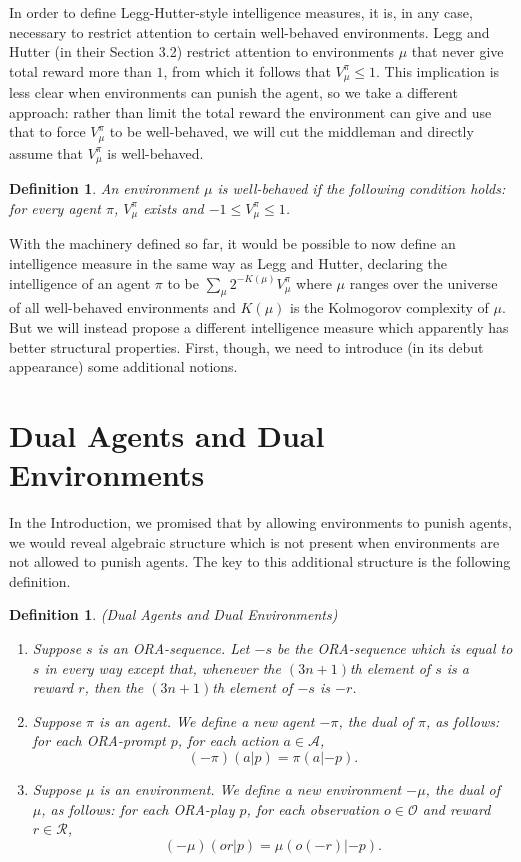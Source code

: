 \documentclass{article}
\newtheorem{definition}[theorem]{Definition}
\begin{document}
In order to define Legg-Hutter-style
intelligence measures, it is, in any case, necessary to restrict attention to
certain well-behaved environments. Legg and Hutter (in their Section 3.2)
restrict attention to environments $\mu$ that never give total reward more than $1$,
from which it follows that $V^\pi_\mu\leq 1$. This implication is less clear
when environments can punish the agent, so we take a different approach:
rather than limit the total reward the environment can give and use that to
force $V^\pi_\mu$ to be well-behaved, we will cut the middleman and
directly assume that $V^\pi_\mu$ is well-behaved.

\begin{definition}
    An environment $\mu$ is \emph{well-behaved} if the following
    condition holds: for every agent $\pi$, $V^\pi_\mu$ exists and
    $-1\leq V^\pi_\mu\leq 1$.
\end{definition}

With the machinery defined so far, it would be possible to now define an
intelligence measure in the same way as Legg and Hutter,
declaring the intelligence of an agent $\pi$ to be
$\sum_{\mu} 2^{-K(\mu)}V^\pi_\mu$ where $\mu$ ranges over the universe
of all well-behaved environments and $K(\mu)$ is the Kolmogorov complexity
of $\mu$. But we will instead propose a different intelligence measure
which apparently has better structural properties. First, though, we need
to introduce (in its debut appearance) some additional notions.

\section{Dual Agents and Dual Environments}

In the Introduction, we promised that by allowing environments to punish agents,
we would reveal algebraic structure which is not present when environments are
not allowed to punish agents. The key to this additional structure is the following
definition.

\begin{definition}
(Dual Agents and Dual Environments)
\begin{enumerate}
    \item
    Suppose $s$ is an ORA-sequence. Let $-s$
    be the ORA-sequence which is equal to $s$ in every way except that,
    whenever the $(3n+1)$th element of $s$ is a reward $r$,
    then the $(3n+1)$th element of $-s$ is $-r$.
    \item
    Suppose $\pi$ is an agent.
    We define a new agent $-\pi$, the \emph{dual} of $\pi$,
    as follows:
    for each ORA-prompt $p$, for each action $a\in\mathcal A$,
    \[(-\pi)(a|p)=\pi(a|{-p}).\]
    \item
    Suppose $\mu$ is an environment.
    We define a new environment $-\mu$, the \emph{dual} of $\mu$,
    as follows:
    for each ORA-play $p$, for each observation $o\in\mathcal O$
    and reward $r\in\mathcal R$,
    \[(-\mu)(or|p)=\mu(o(-r)|{-p}).\]
\end{enumerate}
\end{definition}
\end{document}
